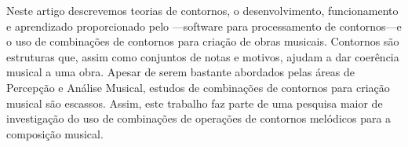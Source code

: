 Neste artigo descrevemos teorias de contornos, o desenvolvimento,
funcionamento e aprendizado proporcionado pelo \goiaba{}---software
para processamento de contornos---e o uso de combinações de contornos
para criação de obras musicais. Contornos são estruturas que, assim
como conjuntos de notas e motivos, ajudam a dar coerência musical a
uma obra. Apesar de serem bastante abordados pelas áreas de Percepção
e Análise Musical, estudos de combinações de contornos para criação
musical são escassos. Assim, este trabalho faz parte de uma pesquisa
maior de investigação do uso de combinações de operações de contornos
melódicos para a composição musical.
